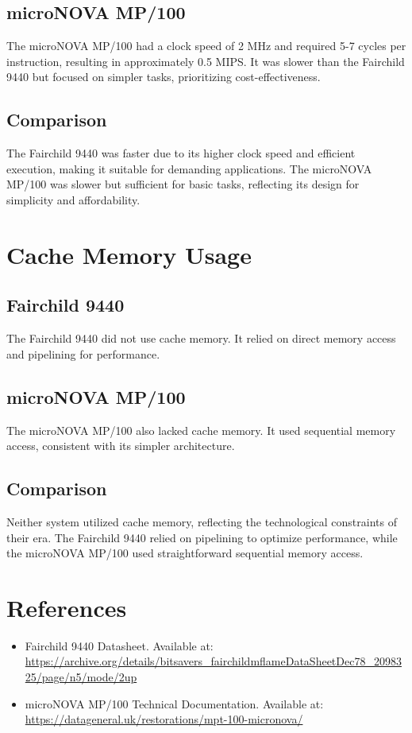 \documentclass[a4paper,12pt]{article}
\begin{document}
\subsection{microNOVA MP/100}

The microNOVA MP/100 had a clock speed of 2 MHz and required 5-7 cycles per instruction, resulting in approximately 0.5 MIPS. It was slower than the Fairchild 9440 but focused on simpler tasks, prioritizing cost-effectiveness.

\subsection{Comparison}

The Fairchild 9440 was faster due to its higher clock speed and efficient execution, making it suitable for demanding applications. The microNOVA MP/100 was slower but sufficient for basic tasks, reflecting its design for simplicity and affordability.

\section{Cache Memory Usage}

\subsection{Fairchild 9440}

The Fairchild 9440 did not use cache memory. It relied on direct memory access and pipelining for performance.

\subsection{microNOVA MP/100}

The microNOVA MP/100 also lacked cache memory. It used sequential memory access, consistent with its simpler architecture.

\subsection{Comparison}

Neither system utilized cache memory, reflecting the technological constraints of their era. The Fairchild 9440 relied on pipelining to optimize performance, while the microNOVA MP/100 used straightforward sequential memory access.



\section*{References}

\begin{itemize}
    \item Fairchild 9440 Datasheet. Available at: \url{https://archive.org/details/bitsavers_fairchildmflameDataSheetDec78_2098325/page/n5/mode/2up}
    \item microNOVA MP/100 Technical Documentation. Available at: \url{https://datageneral.uk/restorations/mpt-100-micronova/}
\end{itemize}
\end{document}
